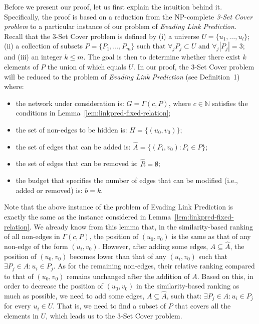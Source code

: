 \documentclass[twocolumn]{article}
\newcommand{\N}{\mathbb{N}}
\newcommand{\FA}{\widehat{A}}
\newcommand{\FR}{\widehat{R}}
\begin{document}
Before we present our proof, let us first explain the intuition behind it. Specifically, the proof is based on a reduction from the NP-complete \emph{3-Set Cover problem} to a particular instance of our problem of \emph{Evading Link Prediction}. Recall that the 3-Set Cover problem is defined by (i) a universe $U=\{u_1, \ldots, u_l\}$; (ii) a collection of subsets $P = \{P_1, \ldots, P_m\}$ such that $\forall_j P_j\subset U$ and $\forall_j \left|P_j\right|=3$; and (iii) an integer $k\leq m$. The goal is then to determine whether there exist $k$ elements of $P$ the union of which equals $U$. In our proof, the 3-Set Cover problem will be reduced to the problem of \emph{Evading Link Prediction} (see Definition~1) where:
\begin{itemize}\itemsep-0.3em
\item the network under consideration is: $G=\Gamma(c,P)$, where $c \in \N$ satisfies the conditions in Lemma~\ref{lem:linkpred-fixed-relation};
\item the set of non-edges to be hidden is: $H=\{(u_0,v_0)\}$;
\item the set of edges that can be added is: $\FA=\{(P_i,v_0):P_i\in P\}$;
\item the set of edges that can be removed is: $\FR=\emptyset$;
\item the budget that specifies the number of edges that can be modified (i.e., added or removed) is: $b=k$.
\end{itemize}

\noindent Note that the above instance of the problem of Evading Link Prediction is exactly the same as the instance considered in Lemma~\ref{lem:linkpred-fixed-relation}. We already know from this lemma that, in the similarity-based ranking of all non-edges in $\Gamma(c,P)$, the position of $(u_0,v_0)$ is the same as that of any non-edge of the form $(u_i,v_0)$. However, after adding some edges, $A\subseteq \FA$, the position of $(u_0,v_0)$ becomes lower than that of any $(u_i,v_0)$ such that $\exists P_j\in A : u_i\in P_j$. As for the remaining non-edges, their relative ranking compared to that of $(u_0,v_0)$ remains unchanged after the addition of $A$. Based on this, in order to decrease the position of $(u_0,v_0)$ in the similarity-based ranking as much as possible, we need to add some edges, $A\subseteq \FA$, such that: $\exists P_j\in A : u_i\in P_j$ for every $u_i\in U$. That is, we need to find a subset of $P$ that covers all the elements in $U$, which leads us to the 3-Set Cover problem.
\end{document}
